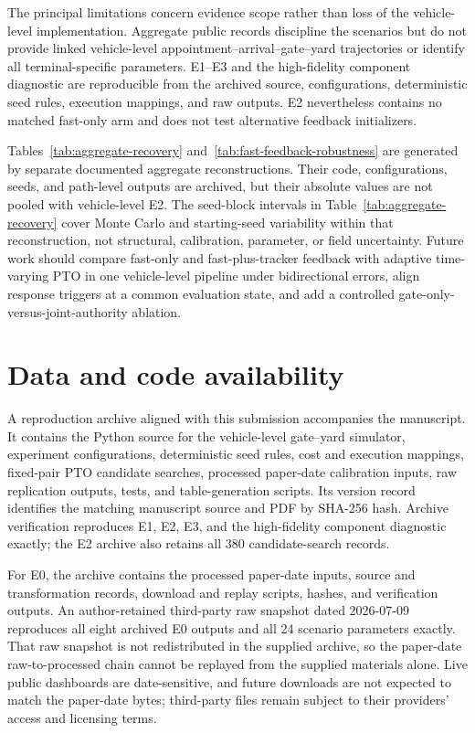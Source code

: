 \documentclass[preprint,12pt,authoryear,a4paper]{elsarticle}
\begin{document}
The principal limitations concern evidence scope rather than loss of the vehicle-level implementation. Aggregate public records discipline the scenarios but do not provide linked vehicle-level appointment--arrival--gate--yard trajectories or identify all terminal-specific parameters. E1--E3 and the high-fidelity component diagnostic are reproducible from the archived source, configurations, deterministic seed rules, execution mappings, and raw outputs. E2 nevertheless contains no matched fast-only arm and does not test alternative feedback initializers.

Tables~\ref{tab:aggregate-recovery} and~\ref{tab:fast-feedback-robustness} are generated by separate documented aggregate reconstructions. Their code, configurations, seeds, and path-level outputs are archived, but their absolute values are not pooled with vehicle-level E2. The seed-block intervals in Table~\ref{tab:aggregate-recovery} cover Monte Carlo and starting-seed variability within that reconstruction, not structural, calibration, parameter, or field uncertainty. Future work should compare fast-only and fast-plus-tracker feedback with adaptive time-varying PTO in one vehicle-level pipeline under bidirectional errors, align response triggers at a common evaluation state, and add a controlled gate-only-versus-joint-authority ablation.

\section*{Data and code availability}

A reproduction archive aligned with this submission accompanies the manuscript. It contains the Python source for the vehicle-level gate--yard simulator, experiment configurations, deterministic seed rules, cost and execution mappings, fixed-pair PTO candidate searches, processed paper-date calibration inputs, raw replication outputs, tests, and table-generation scripts. Its version record identifies the matching manuscript source and PDF by SHA-256 hash. Archive verification reproduces E1, E2, E3, and the high-fidelity component diagnostic exactly; the E2 archive also retains all 380 candidate-search records.

For E0, the archive contains the processed paper-date inputs, source and transformation records, download and replay scripts, hashes, and verification outputs. An author-retained third-party raw snapshot dated 2026-07-09 reproduces all eight archived E0 outputs and all 24 scenario parameters exactly. That raw snapshot is not redistributed in the supplied archive, so the paper-date raw-to-processed chain cannot be replayed from the supplied materials alone. Live public dashboards are date-sensitive, and future downloads are not expected to match the paper-date bytes; third-party files remain subject to their providers' access and licensing terms.
\end{document}
